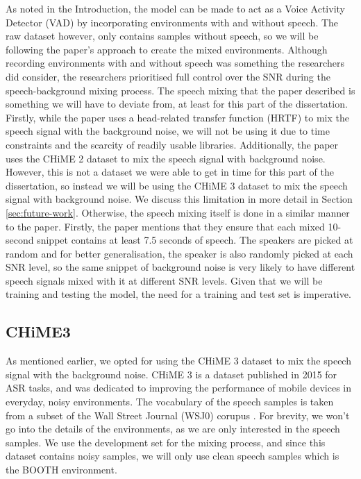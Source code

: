 \documentclass[logo,bsc,singlespacing,parskip,online]{infthesis}
\begin{document}
As noted in the Introduction, the model can be made to act as a Voice Activity Detector (VAD) by incorporating environments with and without speech.
The raw dataset however, only contains samples without speech, so we will be following the paper's approach to create the mixed environments.
Although recording environments with and without speech was something the researchers did consider, the researchers prioritised full control over the SNR during the speech-background mixing process.
The speech mixing that the paper described is something we 
will have to deviate from, at least for this part of the dissertation.
Firstly, while the paper uses a head-related transfer function (HRTF) to mix the speech signal with the background noise,
we will not be using it due to time constraints and the scarcity of readily usable libraries.
Additionally, the paper uses the CHiME 2 dataset \citep{vincent_second_2013} to mix the speech signal with background noise.
However, this is not a dataset we were able to get in time for this part 
of the dissertation, so instead we will be using the CHiME 3 dataset \citep{barker_third_2015} to mix the speech signal with background noise.
We discuss this limitation in more detail in Section \ref{sec:future-work}.
Otherwise, the speech mixing itself is done in a similar manner to the paper.
Firstly, the paper mentions that they ensure that each mixed 10-second snippet contains at least 7.5 seconds of speech.
The speakers are picked at random and for better generalisation, the speaker is also randomly 
picked at each SNR level, so the same snippet of background noise is very likely 
to have different speech signals mixed with it at different SNR levels.
Given that we will be training and testing the model, the need for a training and test set is imperative. 

\subsection{CHiME3}
 As mentioned earlier, we opted for using the CHiME 3 dataset to mix the speech signal with the background noise. 
CHiME 3 is a dataset published in 2015 for ASR tasks, and was dedicated to improving the performance of mobile devices 
in everyday, noisy environments. The vocabulary of the speech samples is taken from a subset of the Wall Street Journal (WSJ0) corupus \cite{wsj0}.
For brevity, we won't go into the details of the environments, as we 
are only interested in the speech samples. 
We use the development set for the mixing process,
and since this dataset contains noisy samples, we will only use clean speech samples 
which is the BOOTH environment.
\end{document}
